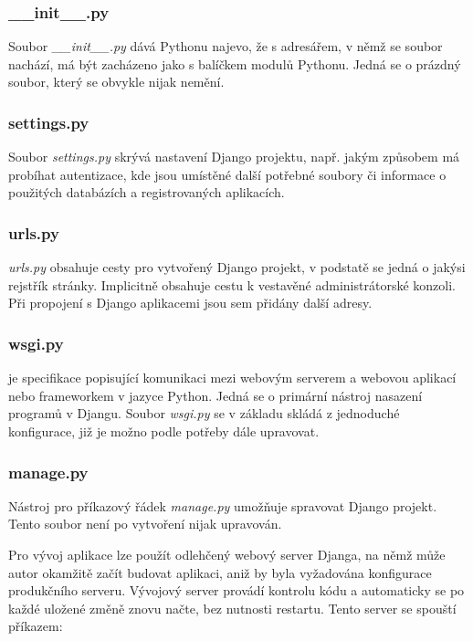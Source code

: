 
\subsubsection{\_\_init\_\_.py}
Soubor \textit{\_\_init\_\_.py} dává Pythonu najevo, že s adresářem, v
němž se soubor nachází, má být zacházeno jako s balíčkem modulů
Pythonu. Jedná se o prázdný soubor, který se obvykle nijak nemění.

\subsubsection{settings.py}
\label{settings}
Soubor \textit{settings.py} skrývá nastavení Django projektu,
např. jakým způsobem má probíhat autentizace, kde jsou umístěné další
potřebné soubory či informace o použitých databázích a registrovaných
aplikacích.

\subsubsection{urls.py}
\textit{urls.py} obsahuje  cesty pro vytvořený Django projekt,
v podstatě se jedná o jakýsi rejstřík stránky. Implicitně obsahuje
cestu k vestavěné administrátorské konzoli. Při propojení s Django
aplikacemi jsou sem přidány další  adresy.

\subsubsection{wsgi.py}
 je specifikace popisující komunikaci mezi webovým serverem a
webovou aplikací nebo frameworkem v jazyce Python. Jedná se o primární
nástroj nasazení programů v Djangu. Soubor \textit{wsgi.py} se v
základu skládá z jednoduché  konfigurace, již je možno podle
potřeby dále upravovat.

\subsubsection{manage.py}
Nástroj pro příkazový řádek \textit{manage.py} umožňuje spravovat
Django projekt. Tento soubor není po vytvoření nijak upravován.

Pro vývoj aplikace lze použít odlehčený webový server Djanga, na němž
může autor okamžitě začít budovat aplikaci, aniž by byla vyžadována
konfigurace produkčního serveru. Vývojový server provádí kontrolu kódu
a automaticky se po každé uložené změně znovu načte, bez nutnosti
restartu. Tento server se spouští příkazem:

